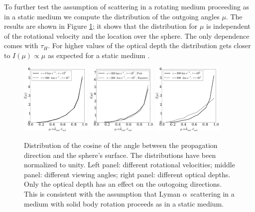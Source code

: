 \documentclass{emulateapj}
\newcommand{\lya}{{Lyman $\alpha$~}}
\begin{document}
To further test the assumption of scattering in a rotating medium proceeding
as in a static medium we compute the distribution of the outgoing
angles $\mu$. The results are shown in Figure \ref{fig:surface}; it
shows that the distribution for $\mu$ is independent of the rotational
velocity and the location over the sphere. The only dependence comes
with $\tau_{H}$. For higher values of the optical depth the
distribution gets closer to $I(\mu)\propto \mu$ as expected for a
static medium \citep{Ahn01}.

%
\begin{figure}[h]
\centerline{
\includegraphics[width=0.30\textwidth]{fig12a.pdf}
\includegraphics[width=0.30\textwidth]{fig12b.pdf}
\includegraphics[width=0.30\textwidth]{fig12c.pdf}}
\caption[]{Distribution of the cosine of the angle between the
  propagation direction and the sphere's surface. The distributions
  have been normalized to unity. Left panel: different rotational
  velocities; middle panel: different viewing angles; right panel:
  different optical depths. Only the optical depth has an effect on
  the outogoing directions. This is consistent with the assumption
  that \lya scattering in a medium with solid body rotation proceeds as in
  a static medium.}
\label{fig:surface}
\end{figure} 
%
\end{document}
